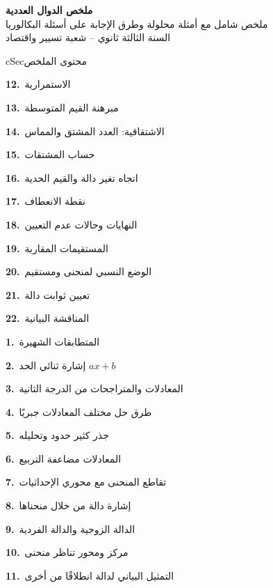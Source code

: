 \documentclass[12pt,a4paper]{article}
\newenvironment{BOX}[2]{\begin{otherlanguage}{english}\begin{arbox}{#1}{#2}}{\end{arbox}\end{otherlanguage}}
\newenvironment{LTR}{\begin{otherlanguage}{english}}{\end{otherlanguage}}
\newcommand{\TwoCol}[4]{\par\begin{LTR}\noindent\begin{minipage}[t]{#1\textwidth}\selectlanguage{arabic}#2\end{minipage}\hfill\begin{minipage}[t]{#3\textwidth}\selectlanguage{arabic}#4\end{minipage}\end{LTR}\par}
\newcommand{\RL}[4]{\TwoCol{#3}{#4}{#1}{#2}}  %
\begin{document}
\begin{LTR}
\begin{tcolorbox}[enhanced,colback=cSec!10,colframe=cSec!40,arc=3mm,halign=center,boxrule=0.6pt,top=12pt,bottom=12pt,before upper={\selectlanguage{arabic}}]
{\color{cSec}\fontsize{28}{34}\selectfont\bfseries ملخص الدوال العددية}\\[8pt]
{\color{cSec!80!black}\large ملخص شامل مع أمثلة محلولة وطرق الإجابة على أسئلة البكالوريا}\\[5pt]
{\color{cSec!80!black}\large السنة الثالثة ثانوي -- شعبة تسيير واقتصاد}
\end{tcolorbox}
\end{LTR}

\begin{BOX}{cSec}{محتوى الملخص}
\RL{0.48}{\textbf{1.}\ المتطابقات الشهيرة\par \textbf{2.}\ إشارة ثنائي الحد $ax+b$\par \textbf{3.}\ المعادلات والمتراجحات من الدرجة الثانية\par \textbf{4.}\ طرق حل مختلف المعادلات جبريًا\par \textbf{5.}\ جذر كثير حدود وتحليله\par \textbf{6.}\ المعادلات مضاعفة التربيع\par \textbf{7.}\ تقاطع المنحنى مع محوري الإحداثيات\par \textbf{8.}\ إشارة دالة من خلال منحناها\par \textbf{9.}\ الدالة الزوجية والدالة الفردية\par \textbf{10.}\ مركز ومحور تناظر منحنى\par \textbf{11.}\ التمثيل البياني لدالة انطلاقًا من أخرى}{0.48}{\textbf{12.}\ الاستمرارية\par \textbf{13.}\ مبرهنة القيم المتوسطة\par \textbf{14.}\ الاشتقاقية: العدد المشتق والمماس\par \textbf{15.}\ حساب المشتقات\par \textbf{16.}\ اتجاه تغير دالة والقيم الحدية\par \textbf{17.}\ نقطة الانعطاف\par \textbf{18.}\ النهايات وحالات عدم التعيين\par \textbf{19.}\ المستقيمات المقاربة\par \textbf{20.}\ الوضع النسبي لمنحنى ومستقيم\par \textbf{21.}\ تعيين ثوابت دالة\par \textbf{22.}\ المناقشة البيانية}
\end{BOX}
\end{document}
